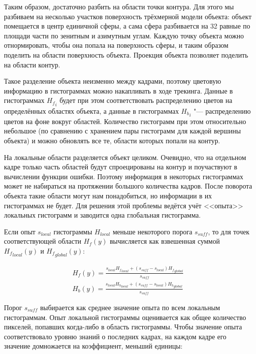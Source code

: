 Таким образом, достаточно разбить на области точки контура.
Для этого мы разбиваем на несколько участков поверхность трёхмерной модели объекта: объект помещается в центр единичной сферы, а сама сфера разбивается на 32 равные по площади части по зенитным и азимутным углам.
Каждую точку объекта можно отнормировать, чтобы она попала на поверхность сферы, и таким образом поделить на области поверхность объекта.
Проекция объекта позволяет поделить на области контур.

Такое разделение объекта неизменно между кадрами, поэтому цветовую информацию в гистограммах можно накапливать в ходе трекинга.
Данные в гистограммах ${H_f}_i$ будет при этом соответствовать распределению цветов на определённых областях объекта, а данные в гистограммах ${H_b}_i$ "--- распределению цветов на фоне вокруг областей.
Количество гистограмм при этом относительно небольшое (по сравнению с хранением пары гистограмм для каждой вершины объекта) и можно обновлять все те, области которых попали на контур.

На локальные области разделяется объект целиком. 
Очевидно, что на отдельном кадре только часть областей будут спроецированы на контур и поучаствуют в вычислении функции ошибки.
Поэтому информация в некоторых гистограммах может не набираться на протяжении большого количества кадров.
После поворота объекта такие области могут нам понадобиться, но информации в их гистограммах не будет.
Для решения этой проблемы ведётся учёт <<опыта>> локальных гистограмм и заводится одна глобальная гистограмма.

Если опыт $s_{local}$ гистограммы $H_{local}$ меньше  некоторого порога $s_{suff}$, то для точек соответствующей области $H_f(y)$  вычисляется как взвешенная суммой ${H_f}_{local}(y)$ и ${H_f}_{global}(y)$:

\begin{equation}
\label{eqn:histo_skill}
\begin{array}{c}
H_f(y) = \frac{s_{local} {H_f}_{local} + (s_{suff} - s_{local}) {H_f}_{global}}{s_{suff}} \\
H_b(y) = \frac{s_{local} {H_b}_{local} + (s_{suff} - s_{local}) {H_b}_{global}}{s_{suff}}
\end{array}
\end{equation}

Порог $s_{suff}$ выбирается как среднее значение опыта по всем локальным гистограммам.
Опыт локальной гистограммы оценивается как общее количество пикселей, попавших когда-либо в область гистограммы.
Чтобы значение опыта соответствовало уровню знаний о последних кадрах, на каждом кадре его значение домножается на коэффициент, меньший единицы:

